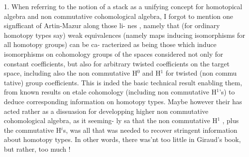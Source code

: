 1.  When referring  to the notion of a stack as a unifying concept
for homotopical algebra and non commutative cohomological algebra,  I
forgot to mention one signfficant  of Artin-Mazur along those li-%
nes ,  namely that (for ordinary homotopy types say) weak equivalences
(namely maps inducing isomorphisms for all homotopy groups)  can be ca-%
racterized as being those which induce isomorphisms on cohomology groups
 of the spaces considered not only for constant coefficients,  but
also for  arbitrary twisted coefficients on the target space,
including also the non commutative H$^{0}$ and H$^{1}$ for twisted  (non commu%
tative) group coefficients.  This is inded the basic technical result
enabling them,  from known results on etale cohomology  (including non
commutative H$^{1}$'s) to deduce corresponding information on homotopy types.
Maybe however  their  has acted rather as a dissuasion for
developping higher non commutative cohomological algebra,  as it seeming-%
\margin{-}ly sa that the non commutative H$^{1}$ ,  plus the commutative H$^{i}$s, was
all that was needed to recover stringent information about homotopy
types.  In other words,  there was'nt too little in Giraud's book,
but rather,  too much !
